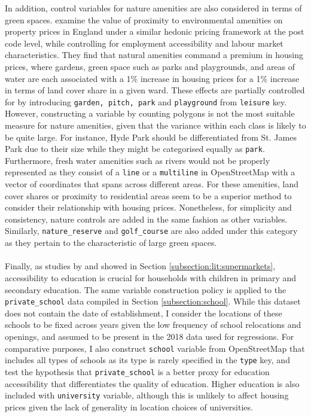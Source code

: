 \documentclass{article}
\begin{document}
In addition, control variables for nature amenities are also considered in terms of green spaces. \citet{Gibbons2014TheApproach} examine the value of proximity to environmental amenities on property prices in England under a similar hedonic pricing framework at the post code level, while controlling for employment accessibility and labour market characteristics. They find that natural amenities command a premium in housing prices, where gardens, green space such as parks and playgrounds, and areas of water are each associated with a 1\% increase in housing prices for a 1\% increase in terms of land cover share in a given ward. These effects are partially controlled for by introducing \texttt{garden, pitch, park} and \texttt{playground} from \texttt{leisure} key. However, constructing a variable by counting polygons is not the most suitable measure for nature amenities, given that the variance within each class is likely to be quite large. For instance, Hyde Park should be differentiated from St. James Park due to their size while they might be categorised equally as \texttt{park}. Furthermore, fresh water amenities such as rivers would not be properly represented as they consist of a \texttt{line} or a \texttt{multiline} in OpenStreetMap with a vector of coordinates that spans across different areas. For these amenities, land cover shares or proximity to residential areas seem to be a superior method to consider their relationship with housing prices. Nonetheless, for simplicity and consistency, nature controls are added in the same fashion as other variables. Similarly, \texttt{nature\_reserve} and \texttt{golf\_course} are also added under this category as they pertain to the characteristic of large green spaces.\\\\
Finally, as studies by \citet{Niu2016ModelingDemand} and \citet{DepartmentforEducation2017HouseMore} showed in Section \ref{subsection:lit:supermarkets}, accessibility to education is crucial for households with children in primary and secondary education. The same variable construction policy is applied to the \texttt{private\_school} data compiled in Section \ref{subsection:school}. While this dataset does not contain the date of establishment, I consider the locations of these schools to be fixed across years given the low frequency of school relocations and openings, and assumed to be present in the 2018 data used for regressions. For comparative purposes, I also construct \texttt{school} variable from OpenStreetMap that includes all types of schools as its type is rarely specified in the \texttt{type} key, and test the hypothesis that \texttt{private\_school} is a better proxy for education accessibility that differentiates the quality of education. Higher education is also included with \texttt{university} variable, although this is unlikely to affect housing prices given the lack of generality in location choices of universities.
\end{document}
